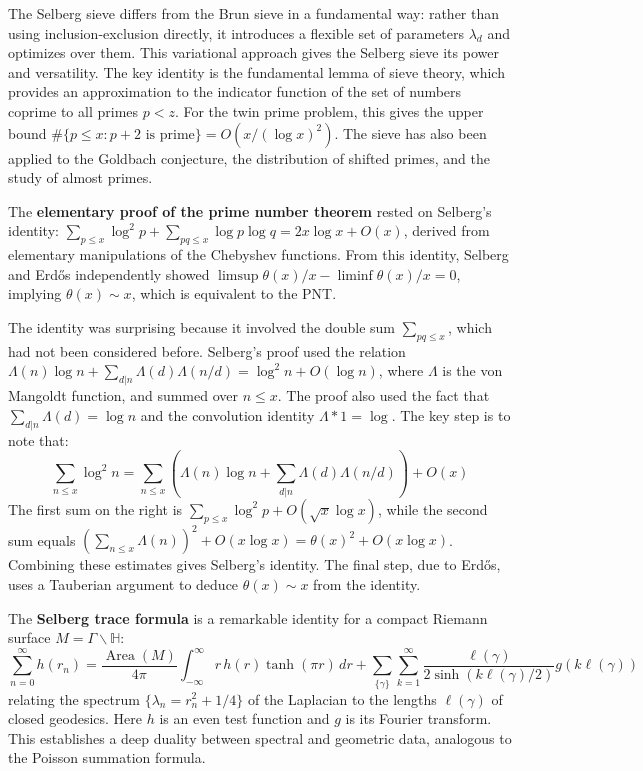 The Selberg sieve differs from the Brun sieve in a fundamental way: rather than using inclusion-exclusion directly, it introduces a flexible set of parameters $\lambda_d$ and optimizes over them. This variational approach gives the Selberg sieve its power and versatility. The key identity is the fundamental lemma of sieve theory, which provides an approximation to the indicator function of the set of numbers coprime to all primes $p < z$. For the twin prime problem, this gives the upper bound $\#\{p \leq x : p+2 \text{ is prime}\} = O(x/(\log x)^2)$. The sieve has also been applied to the Goldbach conjecture, the distribution of shifted primes, and the study of almost primes.

The \textbf{elementary proof of the prime number theorem} rested on Selberg's identity: $\sum_{p \leq x} \log^2 p + \sum_{pq \leq x} \log p \log q = 2x \log x + O(x)$, derived from elementary manipulations of the Chebyshev functions. From this identity, Selberg and Erd\H{o}s independently showed $\limsup \theta(x)/x - \liminf \theta(x)/x = 0$, implying $\theta(x) \sim x$, which is equivalent to the PNT.

The identity was surprising because it involved the double sum $\sum_{pq \leq x}$, which had not been considered before. Selberg's proof used the relation $\Lambda(n) \log n + \sum_{d|n} \Lambda(d) \Lambda(n/d) = \log^2 n + O(\log n)$, where $\Lambda$ is the von Mangoldt function, and summed over $n \leq x$. The proof also used the fact that $\sum_{d|n} \Lambda(d) = \log n$ and the convolution identity $\Lambda * 1 = \log$. The key step is to note that:
\[\sum_{n \leq x} \log^2 n = \sum_{n \leq x} \left( \Lambda(n) \log n + \sum_{d|n} \Lambda(d) \Lambda(n/d) \right) + O(x)\]
The first sum on the right is $\sum_{p \leq x} \log^2 p + O(\sqrt{x} \log x)$, while the second sum equals $(\sum_{n \leq x} \Lambda(n))^2 + O(x \log x) = \theta(x)^2 + O(x \log x)$. Combining these estimates gives Selberg's identity. The final step, due to Erd\H{o}s, uses a Tauberian argument to deduce $\theta(x) \sim x$ from the identity.

The \textbf{Selberg trace formula} is a remarkable identity for a compact Riemann surface $M = \Gamma \backslash \mathbb{H}$:
\[\sum_{n=0}^\infty h(r_n) = \frac{\operatorname{Area}(M)}{4\pi} \int_{-\infty}^\infty r \, h(r) \tanh(\pi r) \, dr + \sum_{\{\gamma\}} \sum_{k=1}^\infty \frac{\ell(\gamma)}{2\sinh(k\ell(\gamma)/2)} g(k\ell(\gamma))\]
relating the spectrum $\{\lambda_n = r_n^2 + 1/4\}$ of the Laplacian to the lengths $\ell(\gamma)$ of closed geodesics. Here $h$ is an even test function and $g$ is its Fourier transform. This establishes a deep duality between spectral and geometric data, analogous to the Poisson summation formula.

